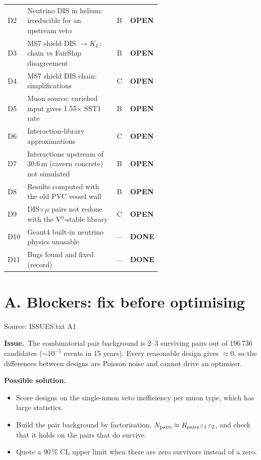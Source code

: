 \documentclass[10pt,a4paper]{article}
\newcommand{\st}[1]{\textbf{#1}}
\newcommand{\stOPEN}{\textcolor{shorange}{\st{OPEN}}}
\newcommand{\stDONE}{\textcolor{okgreen}{\st{DONE}}}
\newenvironment{issue}[5]{%
  \begin{tcolorbox}[breakable,colback=white,colframe=cernblue,boxrule=0.6pt,arc=1.5mm,
    left=6pt,right=6pt,top=4pt,bottom=4pt,
    title={\textbf{#1}\quad #2\hfill{\normalfont\small priority #3\quad\colorbox{white}{#4}}},
    coltitle=white,colbacktitle=cernblue,fonttitle=\normalsize]
  {\color{greytxt}\footnotesize Source: #5}\par\smallskip}{\end{tcolorbox}\vspace{2pt}}
\newcommand{\prob}{\par\noindent\textbf{\color{cernblue}Issue.}\ }
\newcommand{\sol}{\par\smallskip\noindent\textbf{\color{shorange}Possible solution.}\ }
\begin{document}
\begin{longtable}{@{}l p{0.60\linewidth} c l@{}}
D2 & Neutrino DIS in helium: irreducible for an upstream veto & B & \stOPEN\\
D3 & MS7 shield DIS $\to K_L$: chain vs FairShip disagreement & B & \stOPEN\\
D4 & MS7 shield DIS chain: simplifications & C & \stOPEN\\
D5 & Muon source: enriched input gives 1.55$\times$ SST1 rate & B & \stOPEN\\
D6 & Interaction-library approximations & C & \stOPEN\\
D7 & Interactions upstream of 30.6\,m (cavern concrete) not simulated & B & \stOPEN\\
D8 & Results computed with the old PVC vessel wall & B & \stOPEN\\
D9 & DIS$\times\mu$ pairs not redone with the V$^0$-stable library & C & \stOPEN\\
D10 & Geant4 built-in neutrino physics unusable & --- & \stDONE\\
D11 & Bugs found and fixed (record) & --- & \stDONE\\
\bottomrule
\end{longtable}
\normalsize

\section*{A. Blockers: fix before optimising}

\begin{issue}{A1}{Background figure of merit is saturated}{A}{\stOPEN}{ISSUES.txt A1}
\prob The combinatorial pair background is 2--3 surviving pairs out of 196\,736 candidates
($\sim10^{-5}$ events in 15 years). Every reasonable design gives $\approx0$, so the differences between designs
are Poisson noise and cannot drive an optimiser.
\sol
\begin{itemize}
\item Score designs on the single-muon veto inefficiency per muon type, which has large statistics.
\item Build the pair background by factorisation, $N_{\rm pairs}\approx R_{\rm pairs}\,\varepsilon_1\,\varepsilon_2$, and check
      that it holds on the pairs that do survive.
\item Quote a 90\,\% CL upper limit when there are zero survivors instead of a zero.
\end{itemize}
\end{issue}
\end{document}
